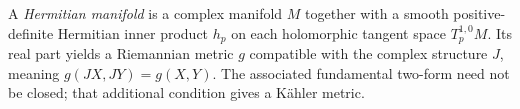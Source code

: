 
A \emph{Hermitian manifold} is a complex manifold $M$ together with a smooth positive-definite Hermitian inner product $h_p$ on each holomorphic tangent space $T_p^{1,0}M$. Its real part yields a Riemannian metric $g$ compatible with the complex structure $J$, meaning $g(JX,JY)=g(X,Y)$. The associated fundamental two-form need not be closed; that additional condition gives a Kähler metric.
